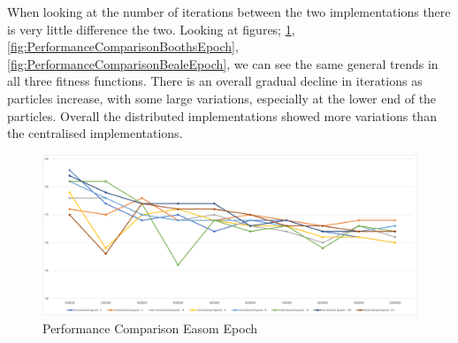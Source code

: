 \documentclass[oneside,12pt]{book}
\begin{document}
\begin{table}[H]
  \caption{TTS Results for 1,000,000 Particles}    
  \label{tab:TTSOneMillion}%
\end{table}%

When looking at the number of iterations between the two implementations there is very little difference the two. Looking at figures; \ref{fig:PerformanceComparisonEasomEpoch}, \ref{fig:PerformanceComparisonBoothsEpoch}, \ref{fig:PerformanceComparisonBealeEpoch}, we can see the same general trends in all three fitness functions. There is an overall gradual decline in iterations as particles increase, with some large variations, especially at the lower end of the particles. Overall the distributed implementations showed more variations than the centralised implementations. 

\begin{figure}[H]
    \centering
    \includegraphics[scale=0.45]{Images/Graphs/PerformanceComparisonEasomEpoch.png}
    \caption{Performance Comparison Easom Epoch}
    \label{fig:PerformanceComparisonEasomEpoch}
\end{figure}
\end{document}
